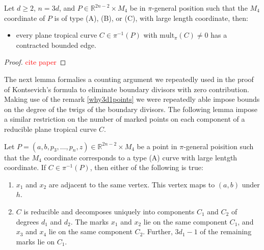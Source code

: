 \begin{lemma}
    Let $d \geq 2$, $n=3d$, and $P \in \mathbb{R}^{2n-2}\times M_{4}$ be in $\pi$-general position such that the $M_{4}$ coordinate of $P$ is of type (A), (B), or (C), with large length coordinate, then:
    \begin{itemize}
        \item every plane tropical curve $C \in \pi^{-1}(P)$ with $\text{mult}_{\pi}(C) \neq 0$ has a contracted bounded edge.
    \end{itemize}
\end{lemma}
\begin{proof}
\textcolor{red}{cite paper}
\end{proof}

The next lemma formalies a counting argument we repeatedly used in the proof of Kontsevich's formula to eliminate boundary divisors with zero contribution.
Making use of the remark \ref{why3d1points} we were repeatedly able impose bounds on the degree of the twigs of the boundary divisors.
The following lemma impose a similar restriction on the number of marked points on each component of a reducible plane tropical curve $C$.

\begin{lemma}
    \label{reduCntLem}
   Let $P = (a,b, p_{3}, \dots, p_{n}, z) \in \mathbb{R}^{2n-2} \times M_{4}$ be a point in $\pi$-general poisition such that the $M_{4}$ coordinate corresponds to a type (A) curve with large lentgth coordinate. 
   If $C \in \pi^{-1}(P)$, then either of the following is true:
   \begin{enumerate}
       \item $x_{1}$ and $x_{2}$ are adjacent to the same vertex. This vertex maps to $(a,b)$ under $h$.
       \item $C$ is reducible and decomposes uniquely into components $C_{1}$ and $C_{2}$ of degrees $d_{1}$ and $d_{2}$. 
           The marks $x_{1}$ and $x_{2}$ lie on the same component $C_{1}$, and $x_{3}$ and $x_{4}$ lie on the same component $C_{2}$.
           Further, $3d_{1}-1$ of the remaining marks lie on $C_{1}$.
   \end{enumerate}
\end{lemma}

\begin{proposition}
    
\end{proposition}


